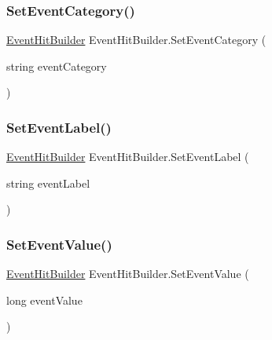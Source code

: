 \mbox{\label{class_event_hit_builder_aa5d8133556117fff3fd1bb6606285053}} 
\subsubsection{\texorpdfstring{Set\+Event\+Category()}{SetEventCategory()}}
{\footnotesize\ttfamily \hyperlink{class_event_hit_builder}{Event\+Hit\+Builder} Event\+Hit\+Builder.\+Set\+Event\+Category (\begin{DoxyParamCaption}\item[{string}]{event\+Category }\end{DoxyParamCaption})}

\mbox{\label{class_event_hit_builder_aaada6635530cfce3a16df4cad5cfe5b9}} 
\subsubsection{\texorpdfstring{Set\+Event\+Label()}{SetEventLabel()}}
{\footnotesize\ttfamily \hyperlink{class_event_hit_builder}{Event\+Hit\+Builder} Event\+Hit\+Builder.\+Set\+Event\+Label (\begin{DoxyParamCaption}\item[{string}]{event\+Label }\end{DoxyParamCaption})}

\mbox{\label{class_event_hit_builder_a7ab3aa0b49584d6ad3011107c8958f30}} 
\subsubsection{\texorpdfstring{Set\+Event\+Value()}{SetEventValue()}}
{\footnotesize\ttfamily \hyperlink{class_event_hit_builder}{Event\+Hit\+Builder} Event\+Hit\+Builder.\+Set\+Event\+Value (\begin{DoxyParamCaption}\item[{long}]{event\+Value }\end{DoxyParamCaption})}

